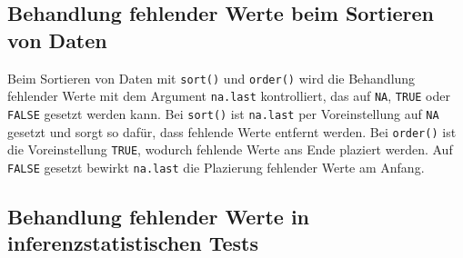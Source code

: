 
\subsection{Behandlung fehlender Werte beim Sortieren von Daten}
\label{sec:sortNA}

Beim Sortieren von Daten mit \lstinline!sort()! und \lstinline!order()! wird die Behandlung fehlender Werte mit dem Argument \lstinline!na.last! kontrolliert, das auf \lstinline!NA!, \lstinline!TRUE! oder \lstinline!FALSE! gesetzt werden kann. Bei \lstinline!sort()! ist \lstinline!na.last! per Voreinstellung auf \lstinline!NA! gesetzt und sorgt so dafür, dass fehlende Werte entfernt werden. Bei \lstinline!order()! ist die Voreinstellung \lstinline!TRUE!, wodurch fehlende Werte ans Ende plaziert werden. Auf \lstinline!FALSE! gesetzt bewirkt \lstinline!na.last! die Plazierung fehlender Werte am Anfang.

\subsection{Behandlung fehlender Werte in inferenzstatistischen Tests}
\label{sec:naTests}

